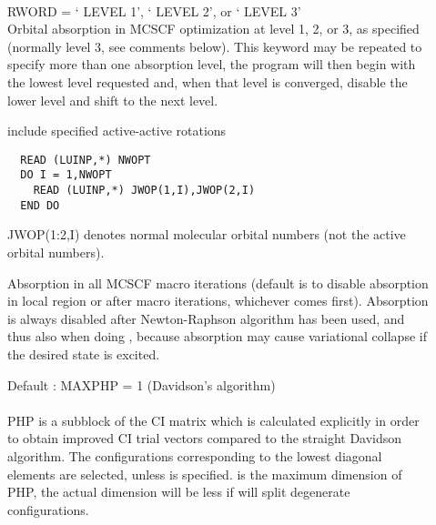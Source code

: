 \begin{description}
\item[]
   \\
  RWORD = ` LEVEL 1', ` LEVEL 2', or ` LEVEL 3'\\
  Orbital absorption in MCSCF optimization
  at level 1, 2, or 3, as specified 
  (normally level 3, see comments below).  This keyword may be repeated to
  specify more than one absorption level, the program will then begin with
  the lowest level requested and, when that level is converged,
  disable the lower level and shift to the next level.
 
\item[]
  include specified active-active rotations
\begin{verbatim}
  READ (LUINP,*) NWOPT
  DO I = 1,NWOPT
    READ (LUINP,*) JWOP(1,I),JWOP(2,I)
  END DO
\end{verbatim}
  JWOP(1:2,I) denotes normal molecular orbital numbers (not the active
  orbital numbers).
 
\item[]
  Absorption in all MCSCF macro iterations
  (default is to disable absorption in 
  local region or after  macro iterations, whichever comes first).
  Absorption is always disabled after Newton-Raphson algorithm has been used,
  and thus also when doing ,
  because absorption may cause variational collapse if the desired state is excited.
 
\item[]
  Default : MAXPHP = 1 (Davidson's algorithm)\\
   \\
  PHP is a subblock of the CI matrix which is calculated explicitly
  in order to obtain improved CI trial vectors compared to the
  straight Davidson algorithm.  The
  configurations corresponding to 
  the lowest diagonal elements are selected, unless
   is specified.
   is the maximum dimension of PHP, the actual dimension
  will be less if  will split degenerate configurations.
 

\end{description}
